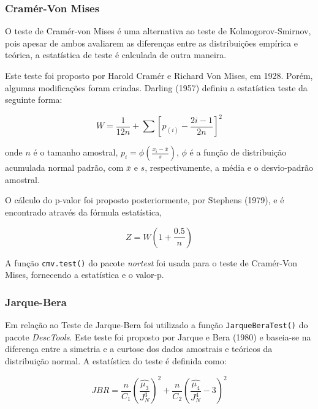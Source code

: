 \documentclass[a4paper,11pt]{article} %
\begin{document}
\subsubsection{Cramér-Von Mises}

O teste de Cramér-von Mises é uma alternativa ao teste de Kolmogorov-Smirnov, pois apesar de ambos avaliarem as diferenças entre as distribuições empírica e teórica, a estatística de teste é calculada de outra maneira.

\vspace{0.5cm}

Este teste foi proposto por Harold Cramér e Richard Von Mises, em 1928. Porém, algumas modificações foram criadas. Darling (1957) definiu a estatística teste da seguinte forma:

\begin{equation}
    W = \frac{1}{12n} + \sum \left[ p_{(i)} - \frac{2i-1}{2n} \right]^{2}
\end{equation}

\noindent onde $n$ é o tamanho amostral, $p_{i} = \phi \left(  \frac{x_{i}-\bar{x}}{s} \right)$, $\phi$ é a função de distribuição acumulada normal padrão, com $\bar{x}$ e $s$, respectivamente, a média e o desvio-padrão amostral.

\vspace{0.5cm}

O cálculo do p-valor foi proposto posteriormente, por Stephens (1979), e é encontrado através da fórmula estatística,

\begin{equation}
    Z = W \left(1 + \frac{0.5}{n} \right)
\end{equation}

A função \texttt{cmv.test()} do pacote \textit{nortest} foi usada para o teste de Cramér-Von Mises, fornecendo a estatística e o valor-p.

\subsubsection{Jarque-Bera}

Em relação ao Teste de Jarque-Bera foi utilizado a função  \texttt{JarqueBeraTest()} do pacote \textit{DescTools}. Este teste foi proposto por Jarque e Bera (1980) e baseia-se na diferença entre a simetria e a curtose dos dados amostrais e teóricos da distribuição normal. A estatística do teste é definida como: 

\begin{equation}
    JBR = \frac{n}{C_{1}} \left( \frac{\hat{\mu_{3}}}{J^{3}_{N}}  \right)^{2} + \frac{n}{C_{2}} \left( \frac{ \hat{\mu_{4}}}{J^{4}_{N}} - 3 \right)^{2} 
\end{equation}
\end{document}
